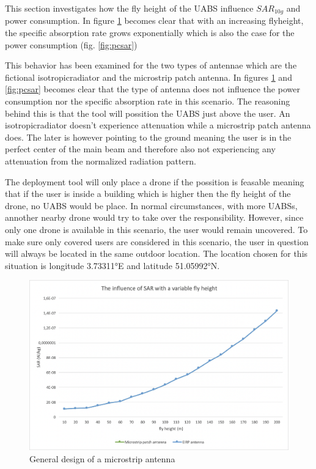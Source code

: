 This section investigates how the fly height of the \gls{UABS} influence $SAR_{10g}$ and power consumption. In figure \ref{fig:fhsar}
becomes clear that with an increasing flyheight, the specific absorption rate grows exponentially which is also the case for the power consumption (fig. \ref{fig:pcsar})  

This behavior has been examined for the two types of antennae which are the fictional \gls{isotropicradiator} and the microstrip patch antenna. In figures 
\ref{fig:fhsar} and \ref{fig:pcsar} becomes clear that the type of antenna does not influence the power consumption nor the specific absorption rate in this  scenario.
The reasoning behind this is that the tool will possition the \gls{UABS} just above the user. An \gls{isotropicradiator} doesn't experience attenuation while a microstrip
patch antenna does. The later is however pointing to the ground meaning the user is in the perfect center of the main beam and therefore also
not experiencing any attenuation from the normalized radiation pattern.

The deployment tool will only place a drone if the possition is feasable meaning that if the user is inside a building which is higher then
the fly height of the drone, no \gls{UABS} would be place. In normal circumstances, with more \gls{UABS}s, annother nearby drone would try to 
take over the responsibility. However, since only one drone is available in this scenario, the user would remain uncovered. To make sure only covered users
are considered in this scenario, the user in question will always be located in the same outdoor location. The location chosen for this situation is longitude 3.73311°E and 
latitude  51.05992°N.

\begin{figure}[th!]
  \includegraphics[width=\textwidth]{../results/s1/flyheight-sar.png}
  \caption{General design of a microstrip antenna}
  \label{fig:fhsar}
\end{figure}

